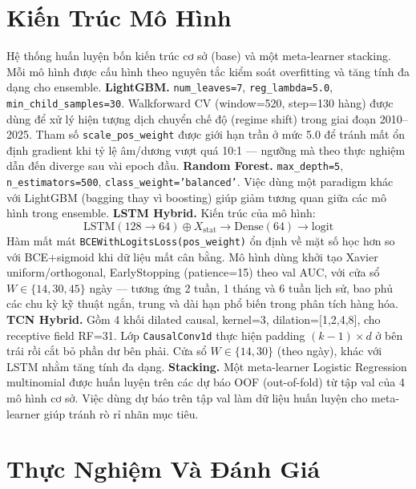 \documentclass[conference]{IEEEtran}
\begin{document}
\section{Kiến Trúc Mô Hình}
Hệ thống huấn luyện bốn kiến trúc cơ sở (base) và một meta-learner stacking.
Mỗi mô hình được cấu hình theo nguyên tắc kiểm soát overfitting và tăng tính
đa dạng cho ensemble.
\textbf{LightGBM.} \texttt{num\_leaves=7}, \texttt{reg\_lambda=5.0},
\texttt{min\_child\_samples=30}. Walkforward CV (window=520, step=130 hàng)
được dùng để xử lý hiện tượng dịch chuyển chế độ (regime shift) trong giai
đoạn 2010--2025. Tham số \texttt{scale\_pos\_weight} được giới hạn trần ở mức
5.0 để tránh mất ổn định gradient khi tỷ lệ âm/dương vượt quá 10:1 ---
ngưỡng mà theo thực nghiệm dẫn đến diverge sau vài epoch đầu.
\textbf{Random Forest.} \texttt{max\_depth=5}, \texttt{n\_estimators=500},
\texttt{class\_weight='balanced'}. Việc dùng một paradigm khác với LightGBM
(bagging thay vì boosting) giúp giảm tương quan giữa các mô hình trong
ensemble.
\textbf{LSTM Hybrid.} Kiến trúc của mô hình:
\begin{equation}
\text{LSTM}(128{\to}64) \oplus X_\text{stat}
\to \text{Dense}(64) \to \text{logit}
\label{eq:lstm}
\end{equation}
Hàm mất mát \texttt{BCEWithLogitsLoss(pos\_weight)} ổn định về mặt số học hơn
so với BCE+sigmoid khi dữ liệu mất cân bằng. Mô hình dùng khởi tạo Xavier
uniform/orthogonal, EarlyStopping (patience=15) theo val AUC, với cửa sổ
$W \in \{14,30,45\}$ ngày --- tương ứng 2 tuần, 1 tháng và 6 tuần lịch sử,
bao phủ các chu kỳ kỹ thuật ngắn, trung và dài hạn phổ biến trong phân tích
hàng hóa.
\textbf{TCN Hybrid.} Gồm 4 khối dilated causal, kernel=3,
dilation=[1,2,4,8], cho receptive field RF=31. Lớp \texttt{CausalConv1d} thực
hiện padding $(k{-}1){\times}d$ ở bên trái rồi cắt bỏ phần dư bên phải. Cửa
sổ $W \in \{14,30\}$ (theo ngày), khác với LSTM nhằm tăng tính đa dạng.
\textbf{Stacking.} Một meta-learner Logistic Regression multinomial được huấn
luyện trên các dự báo OOF (out-of-fold) từ tập val của 4 mô hình cơ sở. Việc
dùng dự báo trên tập val làm dữ liệu huấn luyện cho meta-learner giúp tránh
rò rỉ nhãn mục tiêu.
\section{Thực Nghiệm Và Đánh Giá}
\end{document}
